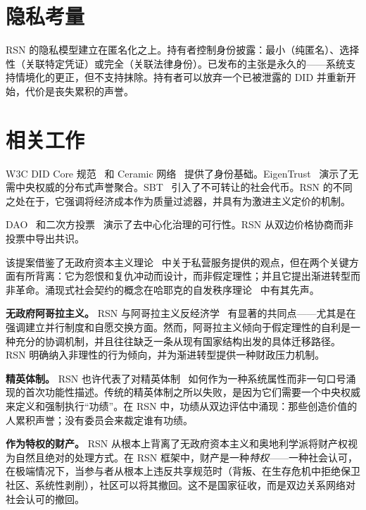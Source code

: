 \documentclass[11pt,a4paper,twocolumn]{article}
\begin{document}
\section{隐私考量}

RSN 的隐私模型建立在匿名化之上。持有者控制身份披露：最小（纯匿名）、选择性（关联特定凭证）或完全（关联法律身份）。已发布的主张是永久的——系统支持情境化的更正，但不支持抹除。持有者可以放弃一个已被泄露的 DID 并重新开始，代价是丧失累积的声誉。

\section{相关工作}

W3C DID Core 规范~\cite{did2022} 和 Ceramic 网络~\cite{ceramic2023} 提供了身份基础。EigenTrust~\cite{kamvar2003} 演示了无需中央权威的分布式声誉聚合。SBT~\cite{weyl2022} 引入了不可转让的社会代币。RSN 的不同之处在于，它强调将经济成本作为质量过滤器，并具有为激进主义定价的机制。

DAO~\cite{buterin2014} 和二次方投票~\cite{buterin2019} 演示了去中心化治理的可行性。RSN 从双边价格协商而非投票中导出共识。

该提案借鉴了无政府资本主义理论~\cite{rothbard1973,hoppe2001} 中关于私营服务提供的观点，但在两个关键方面有所背离：它为怨恨和复仇冲动而设计，而非假定理性；并且它提出渐进转型而非革命。涌现式社会契约的概念在哈耶克的自发秩序理论~\cite{hayek1973} 中有其先声。

\textbf{无政府阿哥拉主义。} RSN 与阿哥拉主义反经济学~\cite{konkin2006} 有显著的共同点——尤其是在强调建立并行制度和自愿交换方面。然而，阿哥拉主义倾向于假定理性的自利是一种充分的协调机制，并且往往缺乏一条从现有国家结构出发的具体迁移路径。RSN 明确纳入非理性的行为倾向，并为渐进转型提供一种财政压力机制。

\textbf{精英体制。} RSN 也许代表了对精英体制~\cite{young1958} 如何作为一种系统属性而非一句口号涌现的首次功能性描述。传统的精英体制之所以失败，是因为它们需要一个中央权威来定义和强制执行“功绩”。在 RSN 中，功绩从双边评估中涌现：那些创造价值的人累积声誉；没有委员会来裁定谁有功绩。

\textbf{作为特权的财产。} RSN 从根本上背离了无政府资本主义和奥地利学派将财产权视为自然且绝对的处理方式。在 RSN 框架中，财产是一种\emph{特权}——一种社会认可，在极端情况下，当参与者从根本上违反共享规范时（背叛、在生存危机中拒绝保卫社区、系统性剥削），社区可以将其撤回。这不是国家征收，而是双边关系网络对社会认可的撤回。
\end{document}
